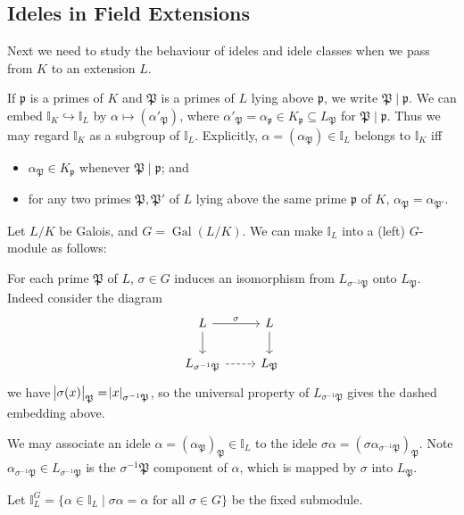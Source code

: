 \documentclass[11pt]{article}
\theoremstyle{definition}
\theoremstyle{plain}
\theoremstyle{remark}
\DeclareMathOperator{\Gal}{Gal}
\newcommand{\II}{\mathbb{I}}
\newcommand{\cp}{\mathfrak{P}}
\newcommand{\fp}{\mathfrak{p}}
\begin{document}
\subsection{Ideles in Field Extensions}

Next we need to study the behaviour of ideles and idele classes when we pass from $K$ to an extension $L$.

If $\fp$ is a primes of $K$ and $\cp$ is a primes of $L$ lying above $\fp$, we write $\cp \mid \fp$. We can embed $\II_K \hookrightarrow \II_L$ by $\alpha \mapsto (\alpha'_\cp)$, where $\alpha'_\cp = \alpha_\fp \in K_\fp \subseteq L_\cp$ for $\cp \mid \fp$. Thus we may regard $\II_K$ as a subgroup of $\II_L$. Explicitly, $\alpha = (\alpha_\cp) \in \II_L$ belongs to $\II_K$ iff
\begin{itemize}
    \item $\alpha_\cp \in K_\fp$ whenever $\cp \mid \fp$; and
    \item for any two primes $\cp, \cp'$ of $L$ lying above the same prime $\fp$ of $K$, $\alpha_\cp = \alpha_{\cp'}$.
\end{itemize}

\noindent Let $L/K$ be Galois, and $G = \Gal(L/K)$. We can make $\II_L$ into a (left) $G$-module as follows:

For each prime $\cp$ of $L$, $\sigma \in G$ induces an isomorphism from $L_{\sigma^{-1}\cp}$ onto $L_\cp$. {\color{blue} Indeed consider the diagram
    \begin{equation*}
        \begin{tikzcd}
            L \arrow[r, "\sigma"] \arrow[d] & L \arrow[d]\\
            L_{\sigma^{-1} \cp} \arrow[r, dashrightarrow] & L_\cp
        \end{tikzcd}
    \end{equation*}
    we have $\abs{\sigma(x)}_\cp = \abs{x}_{\sigma^{-1}\cp}$, so the universal property of $L_{\sigma^{-1} \cp}$ gives the dashed embedding above.}

We may associate an idele $\alpha = (\alpha_\cp)_\cp \in \II_L$ to the idele $\sigma \alpha = (\sigma \alpha_{\sigma^{-1} \cp})_\cp$. Note $\alpha_{\sigma^{-1} \cp} \in L_{\sigma^{-1} \cp}$ is the $\sigma^{-1}\cp$ component of $\alpha$, which is mapped by $\sigma$ into $L_\cp$.

Let $\II_L^G = \{\alpha \in \II_L \mid \sigma \alpha = \alpha \text{ for all } \sigma \in G\}$ be the fixed submodule.
\end{document}
